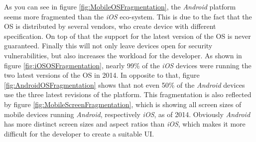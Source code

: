 As you can see in figure \vref{fig:MobileOSFragmentation}, the \emph{Android} platform seems more fragmented than the \emph{iOS} eco-system. This is due to the fact that the \gls{OS} is distributed by several vendors, who create device with different specification. On top of that the support for the latest version of the \gls{OS} is never guaranteed. Finally this will not only leave devices open for security vulnerabilities, but also increases the workload for the developer. As shown in figure \vref{fig:iOSOSFragmentation}, nearly 99\% of the \emph{iOS} devices were running the two latest versions of the \gls{OS} in 2014. In opposite to that, figure \ref{fig:AndroidOSFragmentation} shows that not even 50\% of the \emph{Android} devices use the three latest revisions of the platform. This fragmentation is also reflected by figure \vref{fig:MobileScreenFragmentation}, which is showing all screen sizes of mobile devices running \emph{Android}, respectively \emph{iOS}, as of 2014. Obviously \emph{Android} has more distinct screen sizes and aspect ratios than \emph{iOS}, which makes it more difficult for the developer to create a suitable \gls{UI}.

